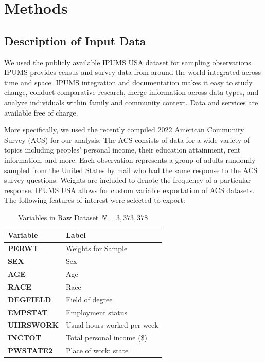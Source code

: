 \documentclass{article}
\begin{document}
\vspace{\baselineskip}
\section*{Methods}
\subsection*{Description of Input Data}
We used the publicly available \href{https://usa.ipums.org/usa/}{IPUMS USA} dataset for sampling observations.
IPUMS provides census and survey data from around the world integrated across time and space. IPUMS integration and documentation makes it easy to study change, conduct comparative research, merge information across data types, and analyze individuals within family and community context. Data and services are available free of charge.

More specifically, we used the recently compiled 2022 American Community Survey (ACS) for our analysis. The ACS consists of data for a wide variety of topics including peoples’ personal income, their education attainment, rent information, and more. Each observation represents a group of adults randomly sampled from the United States by mail who had the same response to the ACS survey questions. Weights are included to denote the frequency of a particular response. IPUMS USA allows for custom variable exportation of ACS datasets. The following features of interest were selected to export:
\vspace{\baselineskip}
\vspace{\baselineskip}

\begin{table}[!h]
    \centering
    \begin{tabular}{lp{6cm}}
        \toprule
        \textbf{Variable} & \textbf{Label} \\
        \midrule
        \textbf{PERWT} & Weights for Sample \\
        \textbf{SEX} & Sex \\
        \textbf{AGE} & Age \\
        \textbf{RACE} & Race \\
        \textbf{DEGFIELD} & Field of degree \\
        \textbf{EMPSTAT} & Employment status \\
        \textbf{UHRSWORK} & Usual hours worked per week \\
        \textbf{INCTOT} & Total personal income (\$) \\
        \textbf{PWSTATE2} & Place of work: state \\
        \bottomrule
    \end{tabular}
    \caption{Variables in Raw Dataset $N= 3,373,378$}
    \label{table:variables}
\end{table}
\end{document}
